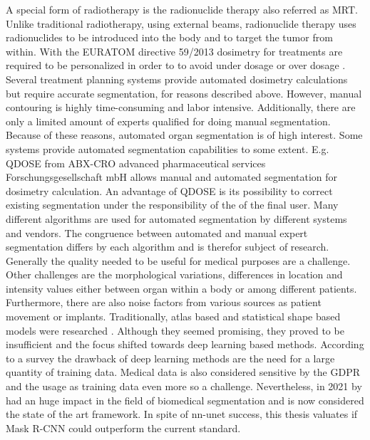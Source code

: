 A special form of radiotherapy is the radionuclide therapy also referred as \ac{MRT}. Unlike traditional radiotherapy, using external beams, radionuclide therapy uses radionuclides to be introduced into the body and to target the tumor from within. With the EURATOM directive 59/2013 \cite{.25Nov22} dosimetry  for treatments are required to be personalized in order to to avoid under dosage or over dosage \cite{DellaGala.2021}. Several treatment planning systems provide automated dosimetry calculations but require accurate segmentation, for reasons described above. However, manual contouring is highly time-consuming and labor intensive. Additionally, there are only a limited amount of experts qualified for doing manual segmentation. Because of these reasons, automated organ segmentation is of high interest. Some systems provide automated segmentation capabilities to some extent. E.g. QDOSE \cite{.23Aug22} from ABX-CRO advanced pharmaceutical services Forschungsgesellschaft mbH \cite{.25Nov22b} allows manual and automated segmentation for dosimetry calculation. An advantage of  QDOSE \cite{.23Aug22} is its possibility to correct existing segmentation under the responsibility of the of the final user. Many different algorithms are used for automated segmentation by different systems and vendors. The congruence between automated and manual expert segmentation differs by each algorithm and is therefor subject of research. Generally the quality needed to be useful for medical purposes are a challenge. Other challenges are the morphological variations, differences in location and intensity  values either between organ within a body or among different patients. Furthermore, there are also noise factors from various sources as patient movement or implants. Traditionally, atlas based and statistical shape based models were researched \cite{Kaur.2022}. Although they seemed promising, they proved to be insufficient \cite{Kaur.2022} and the focus shifted towards deep learning based methods. According to a survey \cite{Altini.2022} the drawback of deep learning methods are the need for a large quantity of training data. Medical data is also considered sensitive by the \ac{GDPR} and the usage as training data even more so a challenge. Nevertheless, in 2021  \cite{Isensee.2021} by \citeauthor{Isensee.2021} had an huge impact in the field of biomedical segmentation and is now considered the state of the art framework. In spite of nn-unet\cite{Isensee.2021} success, this thesis valuates if Mask R-CNN \cite{He.op.2017} could outperform the current standard. 